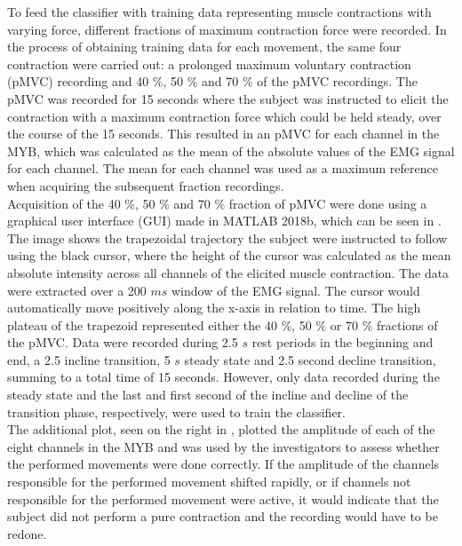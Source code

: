 To feed the classifier with training data representing muscle contractions with varying force, different fractions of maximum contraction force were recorded. In the process of obtaining training data for each movement, the same four contraction were carried out: a prolonged maximum voluntary contraction (pMVC) recording and 40 $\percent$, 50 $\percent$ and 70 $\percent$ of the pMVC recordings.
The pMVC was recorded for 15 seconds where the subject was instructed to elicit the contraction with a maximum contraction force which could be held steady, over the course of the 15 seconds. This resulted in an pMVC for each channel in the MYB, which was calculated as the mean of the absolute values of the EMG signal for each channel. The mean for each channel was used as a maximum reference when acquiring the subsequent fraction recordings. \\
Acquisition of the 40 $\percent$, 50 $\percent$ and 70 $\percent$ fraction of pMVC were done using a graphical user interface (GUI) made in MATLAB 2018b, which can be seen in . The image shows the trapezoidal trajectory the subject were instructed to follow using the black cursor, where the height of the cursor was calculated as the mean absolute intensity across all channels of the elicited muscle contraction. The data were extracted over a 200 $ms$ window of the EMG signal. The cursor would automatically move positively along the x-axis in relation to time. The high plateau of the trapezoid represented either the 40 $\percent$, 50 $\percent$ or 70 $\percent$ fractions of the pMVC. Data were recorded during 2.5 $s$ rest periods in the beginning and end, a 2.5 incline transition, 5 $s$ steady state and 2.5 second decline transition, summing to a total time of 15 seconds. However, only data recorded during the steady state and the last and first second of the incline and decline of the transition phase, respectively, were used to train the classifier. \\
The additional plot, seen on the right in , plotted the amplitude of each of the eight channels in the MYB and was used by the investigators to assess whether the performed movements were done correctly. If the amplitude of the channels responsible for the performed movement shifted rapidly, or if channels not responsible for the performed movement were active, it would indicate that the subject did not perform a pure contraction and the recording would have to be redone.   
   
   
